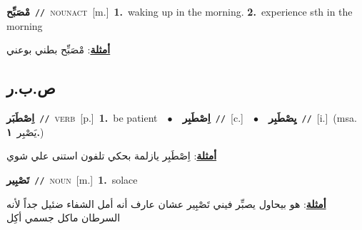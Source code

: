 \documentclass[10pt,a4paper,twoside]{article} %
\begin{document}
\begin{multicols}{2}
{\setlength\topsep{0pt}\textbf{\foreignlanguage{arabic}{مْصَبِّح}}\ {\color{gray}\texttt{//}\color{black}}\ \textsc{noun\textunderscore act}\ [m.]\ \textbf{1.}~waking up in the morning.  \textbf{2.}~experience sth in the morning\  \begin{flushright}\color{gray}\foreignlanguage{arabic}{\textbf{\underline{\foreignlanguage{arabic}{أمثلة}}}: مْصَبِّح بطني بوعني}\end{flushright}\color{black}} \vspace{2mm}

\vspace{-3mm}
\subsection*{\color{blue}\foreignlanguage{arabic}{ص.ب.ر}\color{blue}{}} 

{\setlength\topsep{0pt}\textbf{\foreignlanguage{arabic}{اِصْطَبَر}}\ {\color{gray}\texttt{//}\color{black}}\ \textsc{verb}\ [p.]\ \textbf{1.}~be patient\ \ $\bullet$\ \ \setlength\topsep{0pt}\textbf{\foreignlanguage{arabic}{اِصْطَبِر}}\ {\color{gray}\texttt{//}\color{black}}\ [c.]\ \ $\bullet$\ \ \setlength\topsep{0pt}\textbf{\foreignlanguage{arabic}{يِصْطَبِر}}\ {\color{gray}\texttt{//}\color{black}}\ [i.]\ \color{gray}(msa. \foreignlanguage{arabic}{يَصْبِر}~\foreignlanguage{arabic}{\textbf{١.}})\color{black}\  \begin{flushright}\color{gray}\foreignlanguage{arabic}{\textbf{\underline{\foreignlanguage{arabic}{أمثلة}}}: اِصْطَبِر يازلمة بحكي تلفون استنى علي شوي}\end{flushright}\color{black}} \vspace{2mm}

{\setlength\topsep{0pt}\textbf{\foreignlanguage{arabic}{تَصْبِير}}\ {\color{gray}\texttt{//}\color{black}}\ \textsc{noun}\ [m.]\ \textbf{1.}~solace\  \begin{flushright}\color{gray}\foreignlanguage{arabic}{\textbf{\underline{\foreignlanguage{arabic}{أمثلة}}}: هو بيحاول يصبِّر فيني تَصْبِير عشان عارف أنه أمل الشفاء ضئيل جداً لأنه السرطان ماكل جسمي أكِل}\end{flushright}\color{black}} \vspace{2mm}


\end{multicols}
\end{document}
